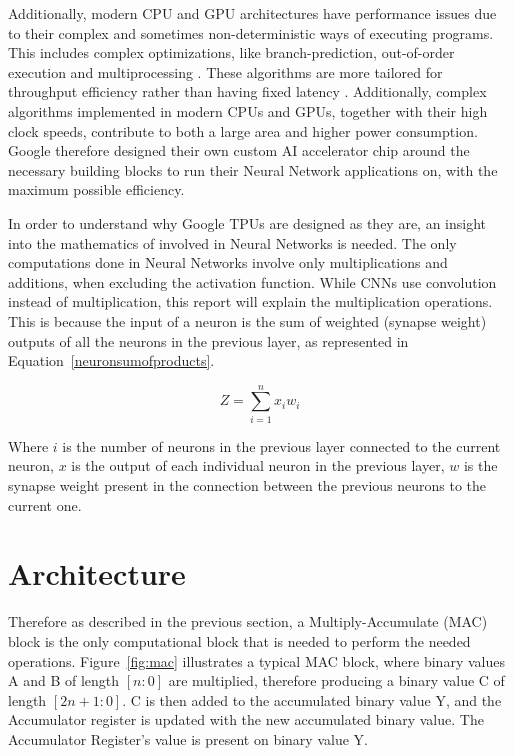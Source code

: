 Additionally, modern CPU and GPU architectures have performance issues due to their complex and sometimes non-deterministic ways of executing programs. This includes complex optimizations, like branch-prediction, out-of-order execution and multiprocessing \citep{paun2013determinism}. These algorithms are more tailored for throughput efficiency rather than having fixed latency \citep{jouppi2017datacenter}. Additionally, complex algorithms implemented in modern CPUs and GPUs, together with their high clock speeds, contribute to both a large area and higher power consumption. Google therefore designed their own custom AI accelerator chip around the necessary building blocks to run their Neural Network applications on, with the maximum possible efficiency.  

In order to understand why Google TPUs are designed as they are, an insight into the mathematics of involved in Neural Networks is needed. The only computations done in Neural Networks involve only multiplications and additions, when excluding the activation function. While CNNs use convolution instead of multiplication, this report will explain the multiplication operations. This is because the input of a neuron is the sum of weighted (synapse weight) outputs of all the neurons in the previous layer, as represented in Equation~\ref{neuronsumofproducts}.

\begin{equation}\label{neuronsumofproducts}
Z = \sum_{i=1}^{n}x_{i}w_{i}
\end{equation}

Where $i$ is the number of neurons in the previous layer connected to the current neuron, $x$ is the output of each individual neuron in the previous layer, $w$ is the synapse weight present in the connection between the previous neurons to the current one. 

\section{Architecture}\label{sec:architecture}

Therefore as described in the previous section, a Multiply-Accumulate (MAC) block is the only computational block that is needed to perform the needed operations. Figure~\ref{fig:mac} illustrates a typical MAC block, where binary values A and B of length $[n:0]$ are multiplied, therefore producing a binary value C of length $[2n+1:0]$. C is then added to the accumulated binary value Y, and the Accumulator register is updated with the new accumulated binary value. The Accumulator Register's value is present on binary value Y.

